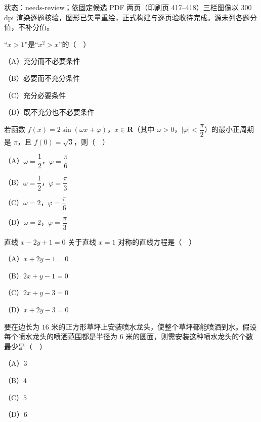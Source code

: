 

状态：needs-review；依固定候选 PDF 两页（印刷页 417–418）三栏图像以 300 dpi 渲染逐题核验，图形已矢量重绘，正式构建与逐页验收待完成。源未列各题分值，不补分值。


\begin{question}
“$x>1$”是“$x^2>x$”的（　）

（A）充分而不必要条件

（B）必要而不充分条件

（C）充分必要条件

（D）既不充分也不必要条件

\end{question}
\begin{question}
若函数 $f(x)=2\sin(\omega x+\varphi)$，$x\in\mathbf R$（其中 $\omega>0$，$|\varphi|<\dfrac{\pi}{2}$）的最小正周期是 $\pi$，且 $f(0)=\sqrt3$，则（　）

（A）$\omega=\dfrac12$，$\varphi=\dfrac{\pi}{6}$

（B）$\omega=\dfrac12$，$\varphi=\dfrac{\pi}{3}$

（C）$\omega=2$，$\varphi=\dfrac{\pi}{6}$

（D）$\omega=2$，$\varphi=\dfrac{\pi}{3}$

\end{question}
\begin{question}
直线 $x-2y+1=0$ 关于直线 $x=1$ 对称的直线方程是（　）

（A）$x+2y-1=0$

（B）$2x+y-1=0$

（C）$2x+y-3=0$

（D）$x+2y-3=0$

\Needspace{0.4\textheight}
\end{question}
\begin{question}
要在边长为 $16$ 米的正方形草坪上安装喷水龙头，使整个草坪都能喷洒到水。假设每个喷水龙头的喷洒范围都是半径为 $6$ 米的圆面，则需安装这种喷水龙头的个数最少是（　）
\nopagebreak[4]
\begin{center}\end{center}
\nopagebreak[4]
（A）$3$

（B）$4$

（C）$5$

（D）$6$

\end{question}
